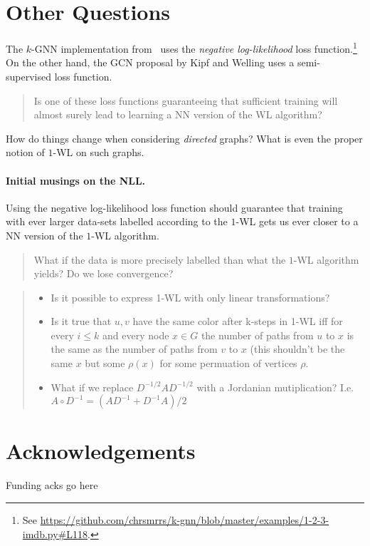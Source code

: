 \section{Other Questions}
The $k$-GNN implementation from~\cite{grohewl} uses the \emph{negative log-likelihood} loss function.\footnote{See
\url{https://github.com/chrsmrrs/k-gnn/blob/master/examples/1-2-3-imdb.py\#L118}.} On
the other hand, the GCN proposal by Kipf and Welling uses a semi-supervised
loss function.
\begin{quote}
    Is one of these loss functions guaranteeing that sufficient training
    will almost surely lead to learning a NN version of the WL algorithm?
\end{quote}

How do things change when considering \emph{directed} graphs? What is even
the proper notion of $1$-WL on such graphs.

\paragraph{Initial musings on the NLL.}
Using the negative log-likelihood loss function should guarantee that
training with ever larger data-sets labelled according to the $1$-WL
gets us ever closer to a NN version of the $1$-WL algorithm. 
\begin{quote}
    What if the
    data is more precisely labelled than what the $1$-WL
    algorithm yields? Do we
    lose convergence?
\end{quote}

\begin{quote}
\begin{itemize}
    \item Is it possible to express 1-WL with only linear transformations?
    \item Is it true that $u,v$ have the same color after k-steps in 1-WL iff for every $i \le k$ and every node $x \in G$ the number of paths from $u$ to $x$ is the same as the number of paths from $v$ to $x$ (this shouldn't be the same $x$ but some $\rho(x)$ for some permuation of vertices $\rho$.
    \item What if we replace $D^{-1/2}AD^{-1/2}$ with a Jordanian
      mutiplication? I.e. $A \circ D^{-1} = (AD^{-1} + D^{-1}A)/2$
\end{itemize}{}
\end{quote}

\section*{Acknowledgements}
Funding acks go here